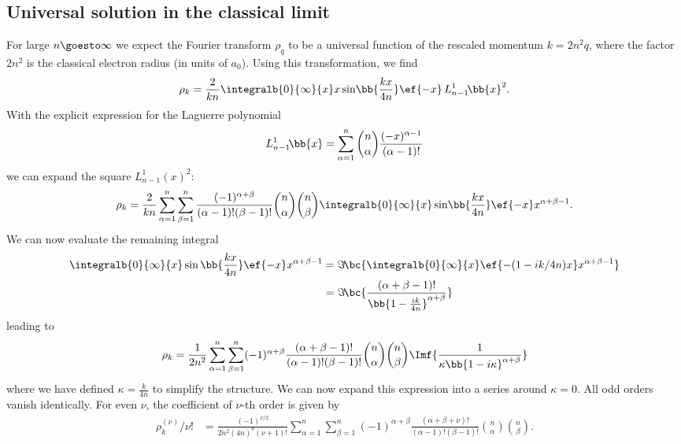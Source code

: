 \subsection{Universal solution in the classical limit}
For large $n \goesto \infty$ we expect the Fourier transform $\rho_q$ to be a universal function of the rescaled momentum $k=2n^2 q$, where the factor $2n^2$ is the classical electron radius (in units of $a_0$). Using this transformation, we find
\begin{align}
\rho_k = \frac{2}{k n}\integralb{0}{\infty}{x} x \sin\!\bb{\frac{kx}{4n}} \ef{-x} \, L_{n-1}^1\!\bb{x}^2.
\end{align}
With the explicit expression for the Laguerre polynomial
\begin{align}
L_{n-1}^1\!\bb{x}=\sum_{\alpha=1}^{n} \binom{n}{\alpha} \frac{(-x)^{\alpha-1}}{(\alpha-1)!}
\end{align}
we can expand the square $L^1_{n-1}(x)^2$:
\begin{align}
\rho_k=\frac{2}{k n} \sum_{\alpha=1}^{n}\sum_{\beta=1}^{n} \frac{(-1)^{\alpha+\beta}}{(\alpha-1)! (\beta-1)!} \binom{n}{\alpha}\binom{n}{\beta} \integralb{0}{\infty}{x} \sin\!\bb{\frac{kx}{4n}} \ef{-x} x^{\alpha+\beta-1}.
\end{align}
We can now evaluate the remaining integral
\begin{align}
    \integralb{0}{\infty}{x} \sin\bb{\frac{kx}{4n}} \ef{-x} x^{\alpha+\beta-1} &= \Im\!\bc{ \integralb{0}{\infty}{x} \ef{-(1-ik /4n)x} x^{\alpha+\beta-1}} \\
    &= \Im\!\bc{ \frac{(\alpha+\beta-1)!}{\bb{1-\frac{i k}{4n}}^{\alpha+\beta}} }
\end{align}
leading to
\begin{align}
    \rho_k=\frac{1}{2n^2} \sum_{\alpha=1}^{n}\sum_{\beta=1}^{n} (-1)^{\alpha+\beta} \frac{(\alpha+\beta-1)!}{(\alpha-1)! (\beta-1)!} \binom{n}{\alpha}\binom{n}{\beta} \Imf{ \frac{1}{\kappa\bb{ 1-i\kappa }^{\alpha+\beta}} }
\end{align}
where we have defined $\kappa=\frac{k}{4n}$ to simplify the structure.
We can now expand this expression into a series around $\kappa=0$.
All odd orders vanish identically.
For even $\nu$, the coefficient of $\nu$-th order is given by
\begin{align}
\rho^{(\nu)}_k/\nu! &=\frac{(-1)^{\nu/2}}{2n^2 (4n)^\nu (\nu+1)!} \sum_{\alpha=1}^{n}\sum_{\beta=1}^{n} (-1)^{\alpha+\beta} \frac{(\alpha+\beta+\nu)!}{(\alpha-1)! (\beta-1)!} \binom{n}{\alpha}\binom{n}{\beta}.
\end{align}
